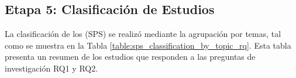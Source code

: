 \subsection{Etapa 5: Clasificación de Estudios}\label{subsec:clasificacion-de-estudios}

La clasificación de los (SPS) se realizó mediante la agrupación por temas, tal como se muestra en la Tabla \ref{table:sps_classification_by_topic_rq}. Esta tabla presenta un resumen de los estudios que responden a las preguntas de investigación RQ1 y RQ2.

